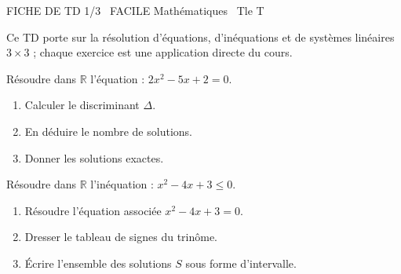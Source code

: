 \documentclass[11pt]{article}
\begin{document}
\begin{tcolorbox}[enhanced,colback=popink,colframe=popink,arc=10pt,boxrule=0pt,left=12pt,right=12pt,top=9pt,bottom=9pt]
{\color{white}\popxbold\small FICHE DE TD 1/3 \textbullet\ FACILE \hfill Mathématiques \textbullet\ Tle T\par}
\end{tcolorbox}
\vspace{4pt}
\noindent Ce TD porte sur la résolution d'équations, d'inéquations et de systèmes linéaires $3 \times 3$ ; chaque exercice est une application directe du cours.

\begin{exercice}
Résoudre dans $\mathbb{R}$ l'équation : $2x^2 - 5x + 2 = 0$.
\begin{enumerate}
    \item Calculer le discriminant $\Delta$.
    \item En déduire le nombre de solutions.
    \item Donner les solutions exactes.
\end{enumerate}
\end{exercice}

\begin{exercice}
Résoudre dans $\mathbb{R}$ l'inéquation : $x^2 - 4x + 3 \leq 0$.
\begin{enumerate}
    \item Résoudre l'équation associée $x^2 - 4x + 3 = 0$.
    \item Dresser le tableau de signes du trinôme.
    \item Écrire l'ensemble des solutions $S$ sous forme d'intervalle.
\end{enumerate}
\end{exercice}
\end{document}
